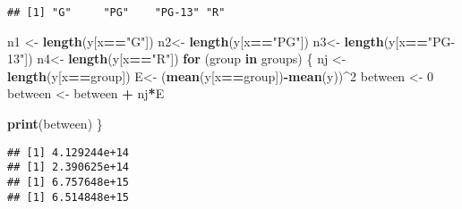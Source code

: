 \documentclass[
]{article}
\newenvironment{Shaded}{\begin{snugshade}}{\end{snugshade}}
\newcommand{\CommentTok}[1]{\textcolor[rgb]{0.56,0.35,0.01}{\textit{#1}}}
\newcommand{\ControlFlowTok}[1]{\textcolor[rgb]{0.13,0.29,0.53}{\textbf{#1}}}
\newcommand{\DecValTok}[1]{\textcolor[rgb]{0.00,0.00,0.81}{#1}}
\newcommand{\KeywordTok}[1]{\textcolor[rgb]{0.13,0.29,0.53}{\textbf{#1}}}
\newcommand{\NormalTok}[1]{#1}
\newcommand{\OperatorTok}[1]{\textcolor[rgb]{0.81,0.36,0.00}{\textbf{#1}}}
\newcommand{\StringTok}[1]{\textcolor[rgb]{0.31,0.60,0.02}{#1}}
\begin{document}
\begin{Shaded}
\end{Shaded}

\begin{verbatim}
## [1] "G"     "PG"    "PG-13" "R"
\end{verbatim}

\begin{Shaded}
\begin{Highlighting}[]
\NormalTok{n1 <-}\StringTok{ }\KeywordTok{length}\NormalTok{(y[x}\OperatorTok{==}\StringTok{"G"}\NormalTok{])}
\NormalTok{n2<-}\StringTok{ }\KeywordTok{length}\NormalTok{(y[x}\OperatorTok{==}\StringTok{"PG"}\NormalTok{])}
\NormalTok{n3<-}\StringTok{ }\KeywordTok{length}\NormalTok{(y[x}\OperatorTok{==}\StringTok{"PG-13"}\NormalTok{])}
\NormalTok{n4<-}\StringTok{ }\KeywordTok{length}\NormalTok{(y[x}\OperatorTok{==}\StringTok{"R"}\NormalTok{])}
\ControlFlowTok{for}\NormalTok{ (group }\ControlFlowTok{in}\NormalTok{ groups) \{}
\NormalTok{ nj <-}\StringTok{ }\KeywordTok{length}\NormalTok{(y[x}\OperatorTok{==}\NormalTok{group]) }
\NormalTok{ E<-}\StringTok{ }\NormalTok{(}\KeywordTok{mean}\NormalTok{(y[x}\OperatorTok{==}\NormalTok{group])}\OperatorTok{-}\KeywordTok{mean}\NormalTok{(y))}\OperatorTok{^}\DecValTok{2}
\NormalTok{ between <-}\StringTok{ }\DecValTok{0}
\NormalTok{ between <-}\StringTok{ }\NormalTok{between }\OperatorTok{+}\StringTok{ }\NormalTok{nj}\OperatorTok{*}\NormalTok{E}
 
 \KeywordTok{print}\NormalTok{(between)}
\NormalTok{\}}
\end{Highlighting}
\end{Shaded}

\begin{verbatim}
## [1] 4.129244e+14
## [1] 2.390625e+14
## [1] 6.757648e+15
## [1] 6.514848e+15
\end{verbatim}
\end{document}

